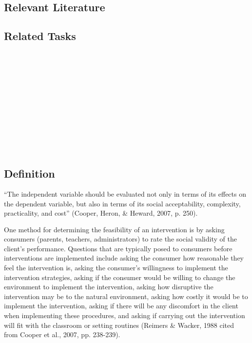 \subsection{Relevant Literature}
\begin{refsection}
\nocite{ayllon1968token,
        cooper2007applied,
        hawkins1984meaningful,
        hawkins1986selection,
        rosales1997behavioral}
\printbibliography[heading=none]
\end{refsection}
\subsection{Related Tasks}
\fourbOne{}\\ 
\fourgThree{}\\
\fourgFive{}\\
\fouriOne{}\\
\fourjOne{}\\
\fourjFive{}\\
\fourjEight{}\\
\fourjTen{}\\
\fourjThirteen{}\\
\fourFKTen{}\\
%
\clearpage \section[\fourjSeven{}]{\fourjSeven{}%
              }
\subsection{Definition}
``The independent variable should be evaluated not only in terms of its effects on the dependent variable, but also in terms of its social acceptability, complexity, practicality, and cost'' (Cooper, Heron, \& Heward, 2007, p. 250).

One method for determining the feasibility of an intervention is by asking consumers (parents, teachers, administrators) to rate the social validity of the client's performance. Questions that are typically posed to consumers before interventions are implemented include asking the consumer how reasonable they feel the intervention is, asking the consumer's willingness to implement the intervention strategies, asking if the consumer would be willing to change the environment to implement the intervention, asking how disruptive the intervention may be to the natural environment, asking how costly it would be to implement the intervention, asking if there will be any discomfort in the client when implementing these procedures, and asking if carrying out the intervention will fit with the classroom or setting routines (Reimers \& Wacker, 1988 cited from Cooper et al., 2007, pp. 238-239).
%
